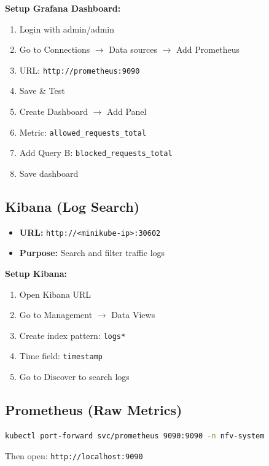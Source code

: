 \documentclass[12pt,a4paper]{article}
\begin{document}
\textbf{Setup Grafana Dashboard:}
\begin{enumerate}
    \item Login with admin/admin
    \item Go to Connections $\rightarrow$ Data sources $\rightarrow$ Add Prometheus
    \item URL: \texttt{http://prometheus:9090}
    \item Save \& Test
    \item Create Dashboard $\rightarrow$ Add Panel
    \item Metric: \texttt{allowed\_requests\_total}
    \item Add Query B: \texttt{blocked\_requests\_total}
    \item Save dashboard
\end{enumerate}

\subsection{Kibana (Log Search)}

\begin{itemize}
    \item \textbf{URL:} \texttt{http://<minikube-ip>:30602}
    \item \textbf{Purpose:} Search and filter traffic logs
\end{itemize}

\textbf{Setup Kibana:}
\begin{enumerate}
    \item Open Kibana URL
    \item Go to Management $\rightarrow$ Data Views
    \item Create index pattern: \texttt{logs*}
    \item Time field: \texttt{timestamp}
    \item Go to Discover to search logs
\end{enumerate}

\subsection{Prometheus (Raw Metrics)}

\begin{lstlisting}[language=bash]
kubectl port-forward svc/prometheus 9090:9090 -n nfv-system
\end{lstlisting}

Then open: \texttt{http://localhost:9090}
\end{document}
